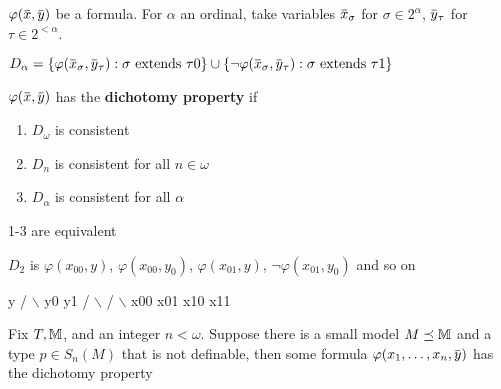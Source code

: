 \documentclass[11pt]{article}
\begin{document}
\begin{definition}[]
\(\varphi(\barx,\bary)\) be a formula. For \(\alpha\) an ordinal, take variables \(\barx_\sigma\)
for \(\sigma\in 2^\alpha\), \(\bary_\tau\) for \(\tau\in 2^{<\alpha}\).

\(D_\alpha=\{\varphi(\barx_\sigma,\bary_\tau):\sigma\text{ extends }\tau 0\}\cup\{\neg\varphi(\barx_\sigma,\bary_\tau):\sigma\text{ extends }\tau 1\}\)

\(\varphi(\barx,\bary)\) has the \textbf{dichotomy property} if
\begin{enumerate}
\item \(D_\omega\) is consistent
\item \(D_n\) is consistent  for all \(n\in\omega\)
\item \(D_\alpha\) is consistent for all \(\alpha\)
\end{enumerate}


1-3 are equivalent
\end{definition}

\begin{examplle}[]
\(D_2\) is \(\varphi(x_{00},y)\), \(\varphi(x_{00},y_0)\), \(\varphi(x_{01},y)\), \(\neg\varphi(x_{01},y_0)\) and so on
\end{examplle}

             y
            / $\backslash$
          y0  y1
        / $\backslash$     /   $\backslash$
x00 x01 x10 x11



\begin{proposition}[]
\label{3.3.8}
Fix \(T,\mathbb{M}\), and an integer \(n<\omega\). Suppose there is a small model \(M\preceq\mathbb{M}\) and a type
 \(p\in S_n(M)\) that is not definable, then some formula \(\varphi(x_1,\dots,x_n,\bary)\) has the dichotomy property
\end{proposition}
\end{document}
